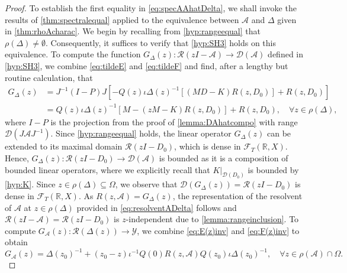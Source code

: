 \documentclass[english]{myarticle}
\begin{document}
\begin{sloppypar}
\begin{proof}
To establish the first equality in \eqref{eq:specAAhatDelta}, we shall invoke the results of \cref{thm:spectralequal} applied to the equivalence between $\mathcal{A}$ and $\Delta$ given in \cref{thm:rhoAcharac}. We begin by recalling from \ref{hyp:rangeequal} that $\rho(\Delta)\neq\emptyset$. Consequently, it suffices to verify that \ref{hyp:SH3} holds on this equivalence. To compute the function $G_\Delta(z) : \mathcal{R}(zI-\mathcal{A}) \to \mathcal{D}(\mathcal{A})$ defined in \ref{hyp:SH3}, we combine \eqref{eq:tildeE} and \eqref{eq:tildeF} and find, after a lengthy but routine calculation, that
\begin{align*}
    G_\Delta(z) &= J^{-1}(I - P)J[-Q(z)\iota \Delta(z)^{-1}[(MD-K)R(z,D_0)] + R(z,D_0)] \\
            &= Q(z)\iota \Delta(z)^{-1}[M-(zM-K)R(z,D_0)] + R(z,D_0), \quad \forall z \in \rho(\Delta),
\end{align*}
where $I-P$ is the projection from the proof of \cref{lemma:DAhatcompo} with range $\mathcal{D}(J\mathcal{A}J^{-1})$. Since \ref{hyp:rangeequal} holds, the linear operator $G_\Delta(z)$ can be extended to its maximal domain $\mathcal{R}(zI - D_0)$, which is dense in $\mathcal{F}_T(\mathbb{R}, X)$. Hence, $G_\Delta(z) : \mathcal{R}(zI-D_0) \to \mathcal{D}(\mathcal{A})$ is bounded as it is a composition of bounded linear operators, where we explicitly recall that $K|_{\mathcal{D}(D_0)}$ is bounded by \ref{hyp:K}. Since $z \in \rho(\Delta) \subseteq \Omega$, we observe that $\mathcal{D}(G_\Delta(z)) = \mathcal{R}(zI - D_0)$ is dense in $\mathcal{F}_T(\mathbb{R},X)$. As $R(z,\mathcal{A}) = G_\Delta(z)$, the representation of the resolvent of $\mathcal{A}$ at $z \in \rho(\Delta)$ provided in \eqref{eq:resolventADelta} follows and $\mathcal{R}(zI-\mathcal{A}) = \mathcal{R}(zI-D_0)$ is $z$-independent due to \cref{lemma:rangeinclusion}. To compute $G_\mathcal{A}(z) : \mathcal{R}(\Delta(z)) \to \mathcal{Y}$, we combine \eqref{eq:E(z)inv} and \eqref{eq:F(z)inv} to obtain
\begin{equation*}
    G_\mathcal{A}(z) = \Delta(z_0)^{-1} + (z_0 - z) \iota^{-1}Q(0) R(z,\mathcal{A})Q(z_0)\iota \Delta(z_0)^{-1}, \quad \forall z \in \rho(\mathcal{A}) \cap \Omega.
\end{equation*}

\end{proof}
\end{sloppypar}
\end{document}

